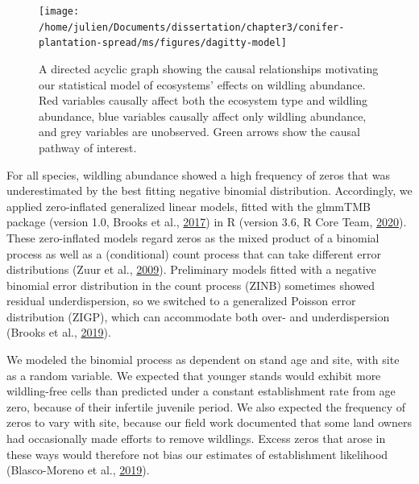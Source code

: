 \documentclass[
]{article}
\begin{document}
\begin{figure}
\texttt{[image: /home/julien/Documents/dissertation/chapter3/conifer-plantation-spread/ms/figures/dagitty-model]} \caption{A directed acyclic graph showing the causal relationships motivating our statistical model of ecosystems' effects on wildling abundance. Red variables causally affect both the ecosystem type and wildling abundance, blue variables causally affect only wildling abundance, and grey variables are unobserved. Green arrows show the causal pathway of interest.}\label{fig:DAG}
\end{figure}

For all species, wildling abundance showed a high frequency of zeros that was underestimated by the best fitting negative binomial distribution.
Accordingly, we applied zero-inflated generalized linear models, fitted with the glmmTMB package (version 1.0, Brooks et al., \protect\hyperlink{ref-brooksGlmmTMBBalancesSpeed2017}{2017}) in R (version 3.6, R Core Team, \protect\hyperlink{ref-rcoreteamLanguageEnvironmentStatistical2020}{2020}).
These zero-inflated models regard zeros as the mixed product of a binomial process as well as a (conditional) count process that can take different error distributions (Zuur et al., \protect\hyperlink{ref-zuurMixedEffectsModels2009}{2009}).
Preliminary models fitted with a negative binomial error distribution in the count process (ZINB) sometimes showed residual underdispersion, so we switched to a generalized Poisson error distribution (ZIGP), which can accommodate both over- and underdispersion (Brooks et al., \protect\hyperlink{ref-brooksStatisticalModelingPatterns2019}{2019}).

We modeled the binomial process as dependent on stand age and site, with site as a random variable.
We expected that younger stands would exhibit more wildling-free cells than predicted under a constant establishment rate from age zero, because of their infertile juvenile period.
We also expected the frequency of zeros to vary with site, because our field work documented that some land owners had occasionally made efforts to remove wildlings.
Excess zeros that arose in these ways would therefore not bias our estimates of establishment likelihood (Blasco-Moreno et al., \protect\hyperlink{ref-blasco-morenoWhatDoesZero2019}{2019}).
\end{document}
